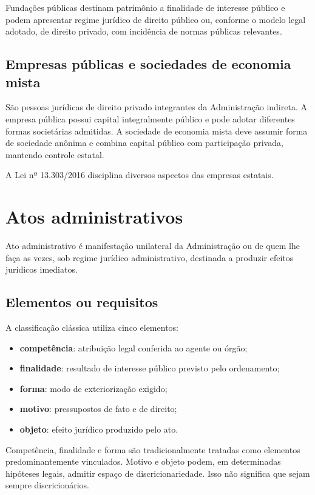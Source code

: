 Fundações públicas destinam patrimônio a finalidade de interesse público e podem apresentar regime jurídico de direito público ou, conforme o modelo legal adotado, de direito privado, com incidência de normas públicas relevantes.

\subsection{Empresas públicas e sociedades de economia mista}

São pessoas jurídicas de direito privado integrantes da Administração indireta. A empresa pública possui capital integralmente público e pode adotar diferentes formas societárias admitidas. A sociedade de economia mista deve assumir forma de sociedade anônima e combina capital público com participação privada, mantendo controle estatal.

A Lei nº 13.303/2016 disciplina diversos aspectos das empresas estatais.

\section{Atos administrativos}

Ato administrativo é manifestação unilateral da Administração ou de quem lhe faça as vezes, sob regime jurídico administrativo, destinada a produzir efeitos jurídicos imediatos.

\subsection{Elementos ou requisitos}

A classificação clássica utiliza cinco elementos:
\begin{itemize}
\item \textbf{competência}: atribuição legal conferida ao agente ou órgão;
\item \textbf{finalidade}: resultado de interesse público previsto pelo ordenamento;
\item \textbf{forma}: modo de exteriorização exigido;
\item \textbf{motivo}: pressupostos de fato e de direito;
\item \textbf{objeto}: efeito jurídico produzido pelo ato.
\end{itemize}

\begin{teoria}
Competência, finalidade e forma são tradicionalmente tratadas como elementos predominantemente vinculados. Motivo e objeto podem, em determinadas hipóteses legais, admitir espaço de discricionariedade. Isso não significa que sejam sempre discricionários.
\end{teoria}

